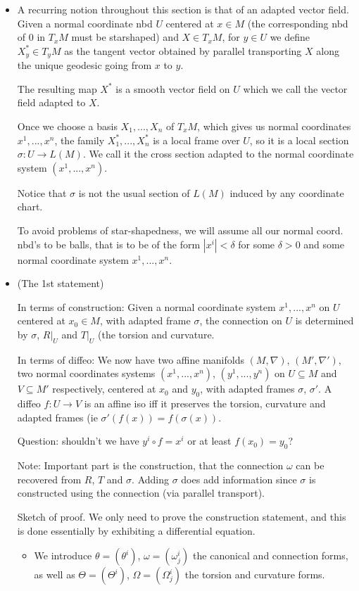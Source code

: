 \documentclass{report}
\theoremstyle{definition}
\begin{document}
\begin{itemize}
    \item A recurring notion throughout this section is that of an adapted vector field. Given a normal coordinate nbd $U$ centered at $x\in M$ (the corresponding nbd of $0$ in $T_xM$ must be starshaped) and $X\in T_xM$, for $y\in U$ we define $X^*_y\in T_yM$ as the tangent vector obtained by parallel transporting $X$ along the unique geodesic going from $x$ to $y$.

    The resulting map $X^*$ is a smooth vector field on $U$ which we call the vector field adapted to $X$.

    Once we choose a basis $X_1,...,X_n$ of $T_xM$, which gives us normal coordinates $x^1,...,x^n$, the family $X^*_1,...,X^*_n$ is a local frame over $U$, so it is a local section $\sigma:U\to L(M)$. We call it the cross section adapted to the normal coordinate system $(x^1,...,x^n)$.

    Notice that $\sigma$ is not the usual section of $L(M)$ induced by any coordinate chart.

    To avoid problems of star-shapedness, we will assume all our normal coord. nbd's to be balls, that is to be of the form $|x^i|<\delta$ for some $\delta>0$ and some normal coordinate system $x^1,...,x^n$.
    \item (The 1st statement)

    In terms of construction: Given a normal coordinate system $x^1,...,x^n$ on $U$ centered at $x_0\in M$, with adapted frame $\sigma$, the connection on $U$ is determined by $\sigma$, $R|_U$ and $T|_U$ (the torsion and curvature.

    In terms of diffeo: We now have two affine manifolds $(M,\nabla)$, $(M',\nabla')$, two normal coordinates systems $(x^1,...,x^n)$, $(y^1,...,y^n)$ on $U\subseteq M$ and $V\subseteq M'$ respectively, centered at $x_0$ and $y_0$, with adapted frames $\sigma$, $\sigma'$. A diffeo $f:U\to V$ is an affine iso iff it preserves the torsion, curvature and adapted frames (ie $\sigma'(f(x))=f(\sigma(x))$.

    Question: shouldn't we have $y^i\circ f=x^i$ or at least $f(x_0)=y_0$?

    Note: Important part is the construction, that the connection $\omega$ can be recovered from $R$, $T$ and $\sigma$. Adding $\sigma$ does add information since $\sigma$ is constructed using the connection (via parallel transport).

    Sketch of proof. We only need to prove the construction statement, and this is done essentially by exhibiting a differential equation.
    \begin{itemize}
        \item We introduce $\theta=(\theta^i)$, $\omega=(\omega^i_j)$ the canonical and connection forms, as well as $\Theta=(\Theta^i)$, $\Omega=(\Omega^i_j)$ the torsion and curvature forms.


\end{itemize}
\end{itemize}
\end{document}
